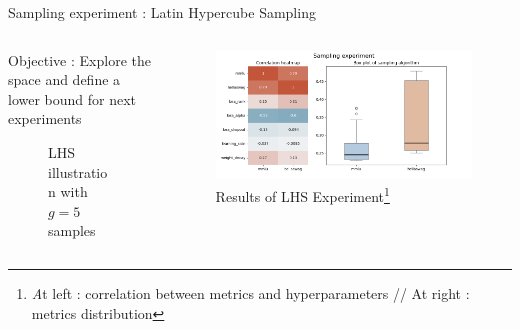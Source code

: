 \begin{frame}{Sampling experiment : Latin Hypercube Sampling}
    
    \begin{columns}
        \begin{column}{0.4\textwidth}
            
            Objective : Explore the space and define a lower bound for next experiments

            \begin{figure}
                \centering

                
                \caption{LHS illustration with $g=5$ samples}
            \end{figure}
            
        \end{column}

        \begin{column}{0.6\textwidth}
            \begin{figure}
                \centering
                \includegraphics[width = \textwidth]{imgs/experiments/lhs/lhs.png}     
                \caption{Results of LHS Experiment\footnote[5]{ \textit At left : correlation between metrics and hyperparameters // At right : metrics distribution}}         
            \end{figure}
            
        \end{column}
\end{columns}  

\end{frame}



